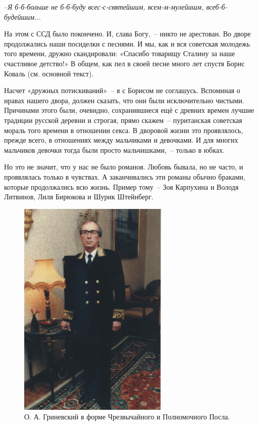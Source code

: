 --\textit{Я б-б-больше не б-б-буду всес-с-святейшим, всем-м-мулейишм, всеб-б-будейшим...}

На этом с ССД было покончено. И, слава Богу,~-- никто не арестован. Во дворе продолжались наши посиделки с песнями. И мы, как и вся советская молодежь того времени, дружно скандировали: «Спасибо товарищу Сталину за наше счастливое детство!» В общем, как пел в своей песне много лет спустя Борис Коваль (см. основной текст).

Насчет «дружных потискиваний»~-- я с Борисом не соглашусь. Вспоминая о нравах нашего двора, должен сказать, что они были исключительно чистыми. Причинами этого были, очевидно, сохранившиеся ещё с древних времен лучшие традиции русской деревни и строгая, прямо скажем~-- пуританская советская мораль того времени в отношении секса. В дворовой жизни это проявлялось, прежде всего, в отношениях между мальчиками и девочками. И для многих мальчиков девочки тогда были просто мальчишками,~-- только в юбках.

Но это не значит, что у нас не было романов. Любовь бывала, но не часто, и проявлялась только в чувствах. А заканчивались эти романы обычно браками, которые продолжались всю жизнь. Пример тому~-- Зоя Карпухина и Володя Литвинов, Лиля Бирюкова и Шурик Штейнберг.

\vspace{5pt}


\begin{figure}
        \includegraphics[height=105mm]{inc/77/1}
        \caption{О. А. Гриневский в форме Чрезвычайного и Полномочного Посла.}
\end{figure}

